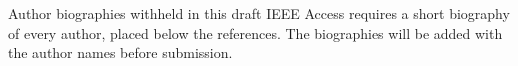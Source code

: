 \documentclass{ieeeaccess}
\begin{document}



\begin{IEEEbiographynophoto}{Author biographies withheld in this draft}
IEEE Access requires a short biography of every author, placed below the references. The biographies will be added with the author names before submission.
\end{IEEEbiographynophoto}

\EOD
\end{document}
